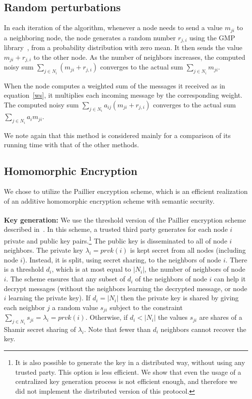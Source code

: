 \documentclass[times, 10pt,twocolumn]{article}
\begin{document}
\subsection{Random perturbations}
 In each iteration of the algorithm, whenever a node
needs to send a value $m_{ji}$ to a neighboring node, the node
generates a random number $r_{j,i}$ using the GMP
library~\cite{GMP}, from a probability distribution with zero
mean. It then sends the value $m_{ji}+r_{j,i}$ to the other node.
 As the number of neighbors increases,
the computed noisy sum $\sum_{j\in N_i} (m_{ji}+r_{j,i})$
converges to the actual sum $\sum_{j\in N_i} m_{ji}$.

When the node computes a weighted sum of the messages it received
as in equation~\ref{ws}, it multiplies each incoming message by
the corresponding weight. The computed noisy sum $\sum_{j\in N_i}
a_{ij}(m_{ji}+r_{j,i})$
 converges to the
actual sum  $\sum_{j\in N_i} a_im_{ji}$.

We note again that this method is considered mainly for a comparison
of its  running
time with that of  the other methods.

\subsection{Homomorphic Encryption}


We chose to utilize the Paillier encryption scheme, which is an
efficient realization of an additive homomorphic encryption scheme
with
semantic security.\\
\\
{\bf Key generation: } We use the threshold version of the
Paillier encryption scheme described in~\cite{Paillier2}. In this
scheme, a trusted third party generates for each node $i$ private
and public key pairs.\footnote{It is also possible to generate the key
  in a distributed way, without using any trusted  party. This option
  is less efficient. We  show that even the usage of a
  centralized key generation process is not efficient enough, and
  therefore we did not implement the distributed version of this protocol.}
  The public key is disseminated to all of
node $i$ neighbors. The private key $\lambda_i=prvk(i)$ is kept
secret from all nodes (including node $i$). Instead, it is split,
using secret sharing, to the neighbors of node $i$. There is a
threshold $d_i$, which is at most equal to $|N_i|$, the number of
neighbors of node $i$. The scheme ensures that any subset of $d_i$
of the neighbors of node $i$ can help it decrypt messages (without
the neighbors learning the decrypted message, or node $i$ learning
the private key). If $d_i=|N_i|$ then the private key is shared by
giving each neighbor $j$ a random value $s_{ji}$ subject to the
constraint $\sum_{j\in N_i}s_{ji} = \lambda_i=prvk(i)$. Otherwise,
if $d_i<|N_i|$ the values $s_{ji}$ are shares of a Shamir secret
sharing of $\lambda_i$. Note that fewer than $d_i$ neighbors cannot
recover the key.
\end{document}
